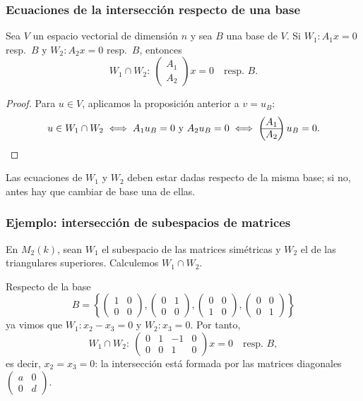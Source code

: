 \begin{frame}
    \frametitle{Ecuaciones de la intersección respecto de una base}

    \begin{proposition}
        Sea $V$ un espacio vectorial de dimensión $n$ y sea $B$ una base
        de $V$. Si $W_1\colon A_1x=0$ resp.\ $B$ y
        $W_2\colon A_2x=0$ resp.\ $B$, entonces
        \[
            W_1\cap W_2\colon\
            \begin{pmatrix}A_1\\ \hline A_2\end{pmatrix}x=0\quad\text{resp.\ }B.
        \]
    \end{proposition}

    \begin{proof}
        Para $u\in V$, aplicamos la proposición anterior a $v=u_B$:
        \[
            u\in W_1\cap W_2
            \iff A_1u_B=0\ \text{y}\ A_2u_B=0
            \iff \begin{pmatrix}A_1\\ \hline A_2\end{pmatrix}u_B=0.\qedhere
        \]
    \end{proof}

    Las ecuaciones de $W_1$ y $W_2$ deben estar dadas respecto de la
    \alert{misma base}; si no, antes hay que cambiar de base una de ellas.
\end{frame}


\begin{frame}
    \frametitle{Ejemplo: intersección de subespacios de matrices}

    \begin{example}
        En $M_2(k)$, sean $W_1$ el subespacio de las matrices simétricas
        y $W_2$ el de las triangulares superiores. Calculemos
        $W_1\cap W_2$.
    \end{example}

    Respecto de la base
    \[
        B=\left\{
        \begin{pmatrix}1&0\\0&0\end{pmatrix},
        \begin{pmatrix}0&1\\0&0\end{pmatrix},
        \begin{pmatrix}0&0\\1&0\end{pmatrix},
        \begin{pmatrix}0&0\\0&1\end{pmatrix}
        \right\}
    \]
    ya vimos que $W_1\colon x_2-x_3=0$ y $W_2\colon x_3=0$. Por tanto,
    \[
        W_1\cap W_2\colon\
        \begin{pmatrix}0&1&-1&0\\0&0&1&0\end{pmatrix}x=0
        \quad\text{resp.\ }B,
    \]
    es decir, $x_2=x_3=0$: la intersección está formada por las matrices
    \alert{diagonales}
    $\begin{pmatrix}a&0\\0&d\end{pmatrix}$.
\end{frame}


